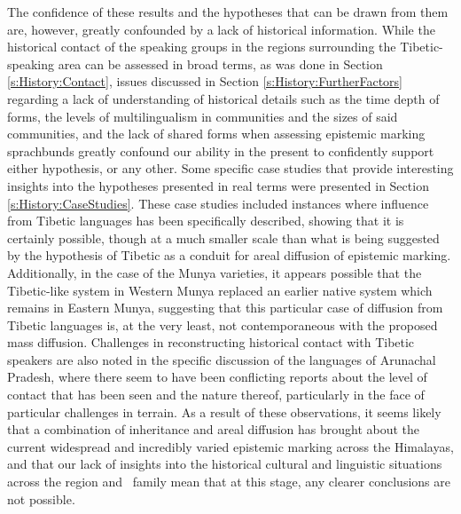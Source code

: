 The confidence of these results and the hypotheses that can be drawn from them are, however, greatly confounded by a lack of historical information. While the historical contact of the speaking groups in the regions surrounding the Tibetic-speaking area can be assessed in broad terms, as was done in Section \ref{s:History:Contact}, issues discussed in Section \ref{s:History:FurtherFactors} regarding a lack of understanding of historical details such as the time depth of forms, the levels of multilingualism in communities and the sizes of said communities, and the lack of shared forms when assessing epistemic marking sprachbunds greatly confound our ability in the present to confidently support either hypothesis, or any other. Some specific case studies that provide interesting insights into the hypotheses presented in real terms were presented in Section \ref{s:History:CaseStudies}. These case studies included instances where influence from Tibetic languages has been specifically described, showing that it is certainly possible, though at a much smaller scale than what is being suggested by the hypothesis of Tibetic as a conduit for areal diffusion of epistemic marking. Additionally, in the case of the Munya varieties, it appears possible that the Tibetic-like system in Western Munya replaced an earlier native system which remains in Eastern Munya, suggesting that this particular case of diffusion from Tibetic languages is, at the very least, not contemporaneous with the proposed mass diffusion. Challenges in reconstructing historical contact with Tibetic speakers are also noted in the specific discussion of the languages of Arunachal Pradesh, where there seem to have been conflicting reports about the level of contact that has been seen and the nature thereof, particularly in the face of particular challenges in terrain. As a result of these observations, it seems likely that a combination of inheritance and areal diffusion has brought about the current widespread and incredibly varied epistemic marking across the Himalayas, and that our lack of insights into the historical cultural and linguistic situations across the region and \lfam\ family mean that at this stage, any clearer conclusions are not possible.